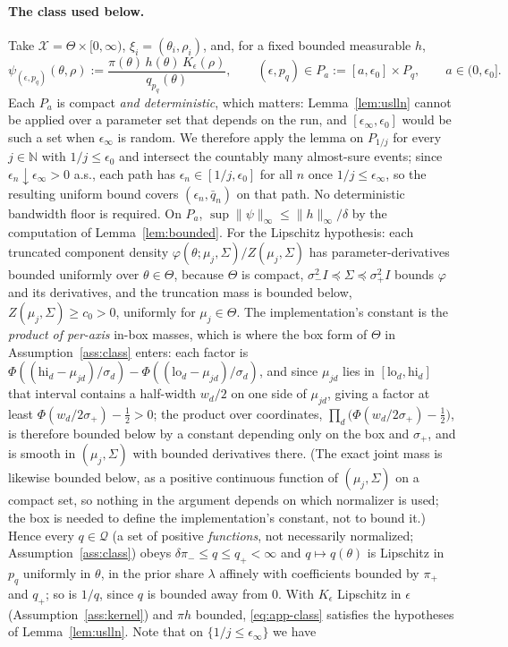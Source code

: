\documentclass[10pt]{article}
\theoremstyle{plain}
\theoremstyle{definition}
\begin{document}
\paragraph{The class used below.} Take $\mathcal{X}=\Theta\times[0,\infty)$, $\xi_i=(\theta_i,\rho_i)$, and, for a fixed bounded measurable $h$,
\begin{equation}
\psi_{(\epsilon,p_q)}(\theta,\rho):=\frac{\pi(\theta)\,h(\theta)\,K_\epsilon(\rho)}{q_{p_q}(\theta)},
\qquad
(\epsilon,p_q)\in P_a:=[a,\epsilon_0]\times P_q,\qquad a\in(0,\epsilon_0] .
\label{eq:app-class}
\end{equation}
Each $P_a$ is compact \emph{and deterministic}, which matters: Lemma~\ref{lem:uslln} cannot be applied over a parameter set that depends on the run, and $[\epsilon_\infty,\epsilon_0]$ would be such a set when $\epsilon_\infty$ is random. We therefore apply the lemma on $P_{1/j}$ for every $j\in\mathbb{N}$ with $1/j\le\epsilon_0$ and intersect the countably many almost-sure events; since $\epsilon_n\downarrow\epsilon_\infty>0$ a.s., each path has $\epsilon_n\in[1/j,\epsilon_0]$ for all $n$ once $1/j\le\epsilon_\infty$, so the resulting uniform bound covers $(\epsilon_n,\bar q_n)$ on that path. No deterministic bandwidth floor is required. On $P_a$, $\sup\|\psi\|_\infty\le\|h\|_\infty/\delta$ by the computation of Lemma~\ref{lem:bounded}. For the Lipschitz hypothesis: each truncated component density $\varphi(\theta;\mu_j,\Sigma)/Z(\mu_j,\Sigma)$ has parameter-derivatives bounded uniformly over $\theta\in\Theta$, because $\Theta$ is compact, $\sigma_-^2I\preceq\Sigma\preceq\sigma_+^2I$ bounds $\varphi$ and its derivatives, and the truncation mass is bounded below, $Z(\mu_j,\Sigma)\ge c_0>0$, uniformly for $\mu_j\in\Theta$. The implementation's constant is the \emph{product of per-axis} in-box masses, which is where the box form of $\Theta$ in Assumption~\ref{ass:class} enters: each factor is $\Phi((\mathrm{hi}_d-\mu_{jd})/\sigma_d)-\Phi((\mathrm{lo}_d-\mu_{jd})/\sigma_d)$, and since $\mu_{jd}$ lies in $[\mathrm{lo}_d,\mathrm{hi}_d]$ that interval contains a half-width $w_d/2$ on one side of $\mu_{jd}$, giving a factor at least $\Phi(w_d/2\sigma_+)-\tfrac12>0$; the product over coordinates, $\prod_{d}\bigl(\Phi(w_d/2\sigma_+)-\tfrac12\bigr)$, is therefore bounded below by a constant depending only on the box and $\sigma_+$, and is smooth in $(\mu_j,\Sigma)$ with bounded derivatives there. (The exact joint mass is likewise bounded below, as a positive continuous function of $(\mu_j,\Sigma)$ on a compact set, so nothing in the argument depends on which normalizer is used; the box is needed to define the implementation's constant, not to bound it.) Hence every $q\in\mathcal{Q}$ (a set of positive \emph{functions}, not necessarily normalized; Assumption~\ref{ass:class}) obeys $\delta\pi_-\le q\le q_+<\infty$ and $q\mapsto q(\theta)$ is Lipschitz in $p_q$ uniformly in $\theta$, in the prior share $\lambda$ affinely with coefficients bounded by $\pi_+$ and $q_+$; so is $1/q$, since $q$ is bounded away from $0$. With $K_\epsilon$ Lipschitz in $\epsilon$ (Assumption~\ref{ass:kernel}) and $\pi h$ bounded, \eqref{eq:app-class} satisfies the hypotheses of Lemma~\ref{lem:uslln}. Note that on $\{1/j\le\epsilon_\infty\}$ we have 
\end{document}
